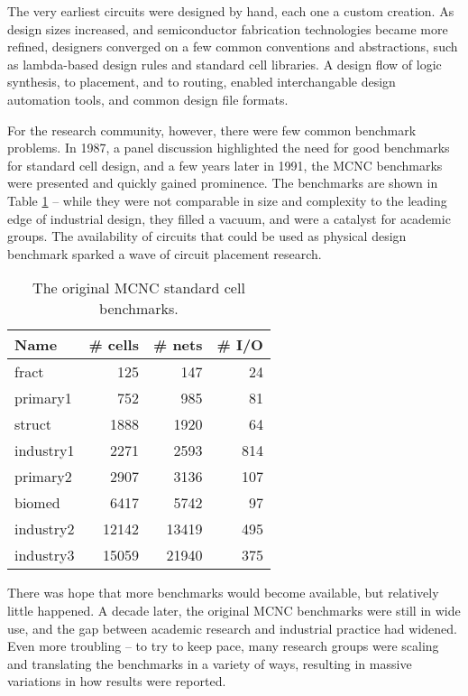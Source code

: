 \documentclass[sigconf]{acmart}
\begin{document}
The very earliest circuits were designed by hand, each one a custom
creation. As design sizes increased, and semiconductor fabrication
technologies became more refined, designers converged on a few
common conventions and abstractions, such as lambda-based design rules
and standard cell libraries\cite{Mead93}.  A design flow of logic
synthesis, to placement, and to routing, enabled interchangable
design automation tools, and common design file formats.

For the research community, however, there were few common benchmark
problems.  In 1987, a panel discussion\cite{Preas87} highlighted the
need for good benchmarks for standard cell design, and a few years
later in 1991, the MCNC benchmarks\cite{Kozminski91} were presented
and quickly gained prominence.  The benchmarks are shown in Table
\ref{tab:mcnc} -- while they were not comparable in size and
complexity to the leading edge of industrial design, they filled a
vacuum, and were a catalyst for academic groups.  The availability of
circuits that could be used as physical design benchmark sparked a
wave of circuit placement research.

\begin{table}
  \begin{tabular}{|l|r|r|r|} \hline
Name & \# cells & \# nets & \# I/O \\ \hline
    fract   &   125 &   147 & 24 \\ \hline
   primary1 &   752 &   985 & 81 \\ \hline
    struct  &  1888 &  1920 & 64 \\ \hline
  industry1 &  2271 & 2593 & 814 \\ \hline
  primary2 & 2907 & 3136 & 107 \\ \hline
  biomed & 6417 & 5742 & 97 \\ \hline
  industry2 & 12142 & 13419 & 495 \\ \hline
  industry3 & 15059 & 21940 & 375 \\ \hline
  \end{tabular}
  \caption{The original MCNC standard cell
    benchmarks\cite{Kozminski91}.}\label{tab:mcnc}
\end{table}


There was hope that more benchmarks would
become available\cite{Kozminski91},
but relatively little happened.
A decade later, the original MCNC
benchmarks were still in wide use, and
the gap between academic research and
industrial practice had widened.
Even more troubling -- to try to keep pace, many research
groups were scaling and translating the benchmarks in
a variety of ways, resulting in massive variations in how
results were reported\cite{Madden010030}.
\end{document}
